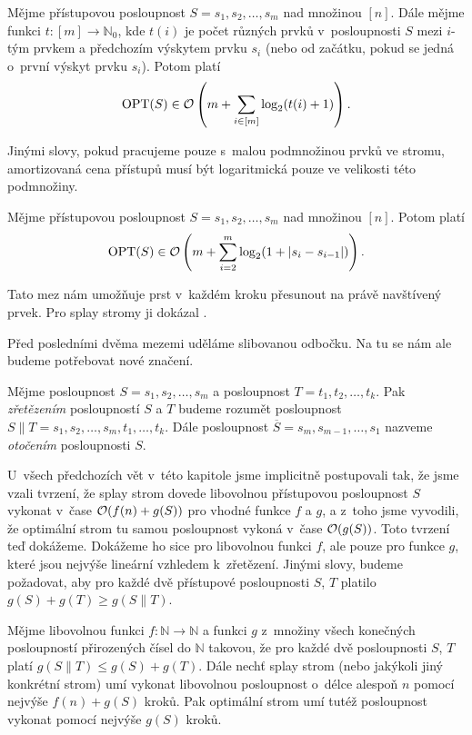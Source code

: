 \begin{veta}

Mějme přístupovou posloupnost $S=s_1, s_2,\dots,s_m$ nad množinou $[n]$. Dále mějme funkci $t: [m]\rightarrow \mathbb N_0$, kde $t(i)$ je počet různých prvků v~posloupnosti $S$ mezi $i$-tým prvkem a předchozím výskytem prvku $s_i$ (nebo od začátku, pokud se jedná o~první výskyt prvku $s_i$). Potom platí $$\opt(S) \in \o\left(m + \sum_{i\in [m]}\log (t(i)+1) \right).$$
\end{veta}

Jinými slovy, pokud pracujeme pouze s~malou podmnožinou prvků ve stromu, amortizovaná cena přístupů musí být logaritmická pouze ve velikosti této podmnožiny.

\begin{veta}
Mějme přístupovou posloupnost $S=s_1, s_2,\dots,s_m$ nad množinou $[n]$. Potom platí $$\opt(S) \in \o\left(m + \sum_{i=2}^m \log(1 + |s_{i}-s_{i-1}|) \right).$$
\end{veta}

Tato mez nám umožňuje prst v~každém kroku přesunout na právě navštívený prvek. Pro splay stromy ji dokázal \citet{dynamicfinger}.

Před posledními dvěma mezemi uděláme slibovanou odbočku. Na tu se nám ale budeme potřebovat nové značení.

\begin{definice}
Mějme posloupnost $S=s_1, s_2,\dots, s_m$ a posloupnost $T=t_1, t_2, \dots, t_k$. Pak
\emph{zřetězením} posloupností $S$ a $T$ budeme rozumět posloupnost $S\|T = s_1, s_2,\dots, s_m, t_1,\dots,t_k$. Dále posloupnost
$\overline{S}=s_m, s_{m-1}, \dots, s_1$  nazveme \emph{otočením} posloupnosti $S$. 
\end{definice}

U~všech předchozích
vět v~této kapitole jsme implicitně postupovali tak, že jsme vzali tvrzení, že splay strom
dovede libovolnou přístupovou posloupnost $S$ vykonat v~čase $\mathcal O(f(n)+g(S))$
pro vhodné funkce $f$ a $g$, a z~toho jsme vyvodili, že optimální strom tu
samou posloupnost vykoná v~čase $\mathcal O(g(S))$. Toto tvrzení teď dokážeme. Dokážeme
ho sice pro libovolnou funkci $f$, ale pouze pro funkce $g$, které jsou nejvýše
lineární vzhledem k~zřetězení. Jinými slovy, budeme požadovat, aby pro každé dvě přístupové posloupnosti $S$, $T$ platilo $g(S) + g(T)\geq
g(S\|T)$.
\begin{tvrz}\label{tvrz:konstantypryc}
Mějme libovolnou funkci $f:\mathbb N \rightarrow \mathbb N$ a funkci $g$ z~množiny všech konečných posloupností přirozených čísel do $\mathbb N$ 
takovou, že pro každé dvě posloupnosti $S$, $T$ platí $g(S\|T)\leq g(S)+g(T)$. Dále nechť splay strom (nebo jakýkoli jiný
konkrétní strom) umí vykonat libovolnou posloupnost o~délce alespoň $n$ pomocí nejvýše
$f(n) + g(S)$ kroků. Pak optimální strom umí tutéž posloupnost vykonat pomocí nejvýše $g(S)$ kroků.
\end{tvrz}

